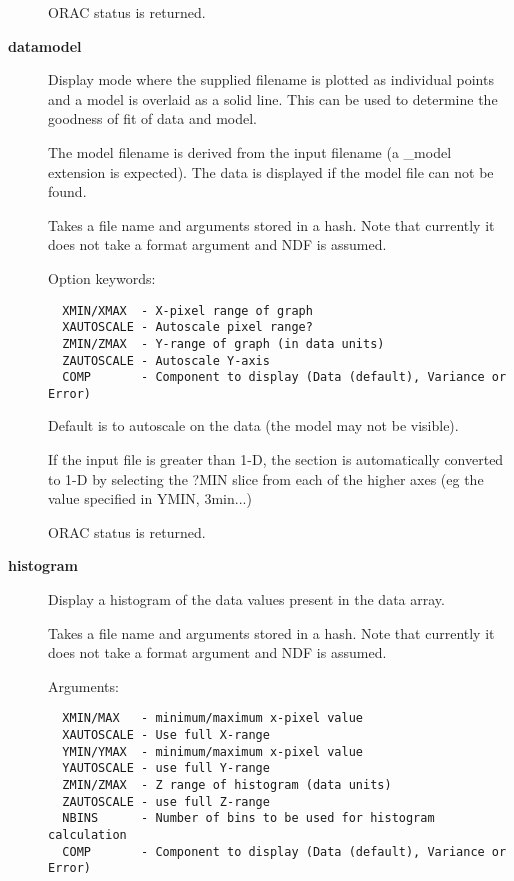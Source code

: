 \begin{description}
ORAC status is returned.


\item[{\textbf{datamodel}}] \mbox{}

Display mode where the supplied filename is plotted as individual
points and a model is overlaid as a solid line. This can be used
to determine the goodness of fit of data and model.



The model filename is derived from the input filename (a \_model
extension is expected). The data is displayed if the model
file can not be found.



Takes a file name and arguments stored in a hash.
Note that currently it does not take a format argument
and NDF is assumed.



Option keywords:

\begin{verbatim}
  XMIN/XMAX  - X-pixel range of graph
  XAUTOSCALE - Autoscale pixel range?
  ZMIN/ZMAX  - Y-range of graph (in data units)
  ZAUTOSCALE - Autoscale Y-axis
  COMP       - Component to display (Data (default), Variance or Error)
\end{verbatim}


Default is to autoscale on the data (the model may not be visible).



If the input file is greater than 1-D, the section is automatically
converted to 1-D by selecting the ?MIN slice from each of the
higher axes (eg the value specified in YMIN, 3min...)



ORAC status is returned.


\item[{\textbf{histogram}}] \mbox{}

Display a histogram of the data values present in the
data array.



Takes a file name and arguments stored in a hash.
Note that currently it does not take a format argument
and NDF is assumed.



Arguments:

\begin{verbatim}
  XMIN/MAX   - minimum/maximum x-pixel value
  XAUTOSCALE - Use full X-range
  YMIN/YMAX  - minimum/maximum x-pixel value
  YAUTOSCALE - use full Y-range
  ZMIN/ZMAX  - Z range of histogram (data units)
  ZAUTOSCALE - use full Z-range
  NBINS      - Number of bins to be used for histogram calculation
  COMP       - Component to display (Data (default), Variance or Error)
\end{verbatim}



\end{description}
